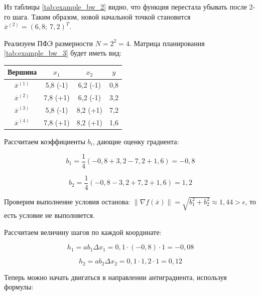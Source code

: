 \documentclass[a4paper,12pt]{report}
\begin{document}
Из таблицы \ref{tab:example_bw_2} видно, что функция перестала убывать после 2-го шага. Таким образом, новой начальной точкой становится $\overline{x}^{(2)} = (6,8;\ 7,2)^{T}$.

Реализуем ПФЭ размерности $N = 2^{2} = 4$. Матрица планирования \ref{tab:example_bw_3} будет иметь вид:

\begin{center}
  \captionsetup{justification=raggedleft}
  \label{tab:example_bw_3}
  \begin{tabular}{|c|c|c|c|}
    \hline
    Вершина & $x_{1}$ & $x_{2}$ & $y$\\
    \hline
    $\overline{x}^{(1)}$ & 5,8 (-1) & 6,2 (-1) & 0,8\\
    \hline
    $\overline{x}^{(2)}$ & 7,8 (+1) & 6,2 (-1) & 3,2\\
    \hline
    $\overline{x}^{(3)}$ & 5,8 (-1) & 8,2 (+1) & 7,2\\
    \hline
    $\overline{x}^{(4)}$ & 7,8 (+1) & 8,2 (+1) & 1,6\\
    \hline
  \end{tabular}
\end{center}

Рассчитаем коэффициенты $b_{i}$, дающие оценку градиента: 

\begin{equation*}
b_{1} = \frac{1}{4}\left(-0,8+3,2-7,2+1,6\right) = -0,8
\end{equation*}

\begin{equation*}
b_{2} = \frac{1}{4}\left(-0,8-3,2+7,2+1,6\right) = 1,2
\end{equation*}

Проверим выполнение условия останова: $\left\|\nabla f(\overline{x})\right\| = \sqrt{b^{2}_{1} + b^{2}_{2}} \approx 1,44 > \epsilon$, то есть условие не выполняется.

Рассчитаем величину шагов по каждой координате:

\begin{equation*}
h_{1} = ab_{1}\Delta x_{1} = 0,1\cdot(-0,8)\cdot1 = -0,08
\end{equation*}

\begin{equation*}
h_{2} = ab_{2}\Delta x_{2} = 0,1\cdot1,2\cdot1 = 0,12
\end{equation*}

Теперь можно начать двигаться в направлении антиградиента, используя формулы:
\end{document}
